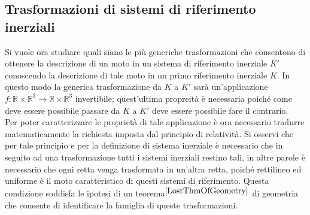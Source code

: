 \subsection{Trasformazioni di sistemi di riferimento inerziali}
Si vuole ora studiare quali siano le più generiche trasformazioni che consentono di ottenere la descrizione di un moto in un sistema di riferimento inerziale $K'$ conoscendo la descrizione di tale moto in un primo riferimento inerziale $K$. In questo modo la generica trasformazione da $K$ a $K'$ sarà un'applicazione $f:\mathbb{R}\times \mathbb{R}^3\rightarrow\mathbb{R}\times \mathbb{R}^3$ invertibile; quest'ultima propreità è necessaria poiché come deve essere possibile passare da $K$ a $K'$ deve essere possibile fare il contrario.\\
Per poter caratterizzare le proprietà di tale applicazione è ora necessario tradurre matematicamente la richiesta imposta dal principio di relatività. Si osservi che per tale principio e per la definizione di sistema inerziale è necessario che in seguito ad una trasformazione tutti i sistemi inerziali restino tali, in altre parole è necessario che ogni retta venga trasformata in un'altra retta, poiché rettilineo ed uniforme è il moto caratteristico di questi sistemi di riferimento. Questa condizione soddisfa le ipotesi di un teorema$^{\cite{LostThmOfGeometry}}$ di geometria che consente di identificare la famiglia di queste trasformazioni.

